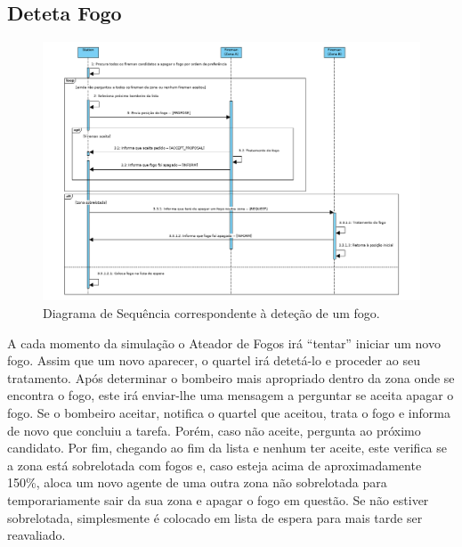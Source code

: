 \documentclass[a4paper]{article}
\begin{document}
\pagebreak
\subsection{Deteta Fogo}
\begin{figure}[!h]
    \centering
    \includegraphics[scale=0.35]{DetetaFogo.png}
    \caption{Diagrama de Sequência correspondente à deteção de um fogo.}
\end{figure}
A cada momento da simulação o Ateador de Fogos irá “tentar” iniciar um novo fogo. Assim que um novo aparecer, o quartel irá detetá-lo e proceder ao seu tratamento. Após determinar o bombeiro mais apropriado dentro da zona onde se encontra o fogo, este irá enviar-lhe uma mensagem a perguntar se aceita apagar o fogo. Se o bombeiro aceitar, notifica o quartel que aceitou, trata o fogo e informa de novo que concluiu a tarefa. Porém, caso não aceite, pergunta ao próximo candidato. Por fim, chegando ao fim da lista e nenhum ter aceite, este verifica se a zona está sobrelotada com fogos e, caso esteja acima de aproximadamente 150\%, aloca um novo agente de uma outra zona não sobrelotada para temporariamente sair da sua zona e apagar o fogo em questão. Se não estiver sobrelotada, simplesmente é colocado em lista de espera para mais tarde ser reavaliado.

\pagebreak
\end{document}
